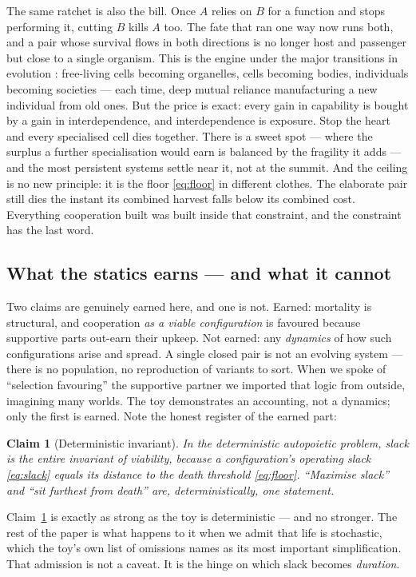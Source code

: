 \documentclass[11pt]{article}
\theoremstyle{plain}
\newtheorem{claim}{Claim}
\theoremstyle{definition}
\begin{document}
The same ratchet is also the bill. Once $A$ relies on $B$ for a function and stops performing it, cutting $B$ kills $A$ too. The fate that ran one way now runs both, and a pair whose survival flows in both directions is no longer host and passenger but close to a single organism. This is the engine under the major transitions in evolution \cite{maynardsmith1995}: free-living cells becoming organelles, cells becoming bodies, individuals becoming societies --- each time, deep mutual reliance manufacturing a new individual from old ones. But the price is exact: every gain in capability is bought by a gain in interdependence, and interdependence is exposure. Stop the heart and every specialised cell dies together. There is a sweet spot --- where the surplus a further specialisation would earn is balanced by the fragility it adds --- and the most persistent systems settle near it, not at the summit. And the ceiling is no new principle: it is the floor \eqref{eq:floor} in different clothes. The elaborate pair still dies the instant its combined harvest falls below its combined cost. Everything cooperation built was built inside that constraint, and the constraint has the last word.

\subsection{What the statics earns --- and what it cannot}
\label{sec:statics-limit}

Two claims are genuinely earned here, and one is not. Earned: mortality is structural, and cooperation \emph{as a viable configuration} is favoured because supportive parts out-earn their upkeep. Not earned: any \emph{dynamics} of how such configurations arise and spread. A single closed pair is not an evolving system --- there is no population, no reproduction of variants to sort. When we spoke of ``selection favouring'' the supportive partner we imported that logic from outside, imagining many worlds. The toy demonstrates an accounting, not a dynamics; only the first is earned. Note the honest register of the earned part:
\begin{claim}[Deterministic invariant]
\label{claim:static}
In the deterministic autopoietic problem, slack is the entire invariant of viability, because a configuration's operating slack \eqref{eq:slack} equals its distance to the death threshold \eqref{eq:floor}. ``Maximise slack'' and ``sit furthest from death'' are, deterministically, one statement.
\end{claim}
\noindent Claim~\ref{claim:static} is exactly as strong as the toy is deterministic --- and no stronger. The rest of the paper is what happens to it when we admit that life is stochastic, which the toy's own list of omissions names as its most important simplification. That admission is not a caveat. It is the hinge on which slack becomes \emph{duration}.
\end{document}
